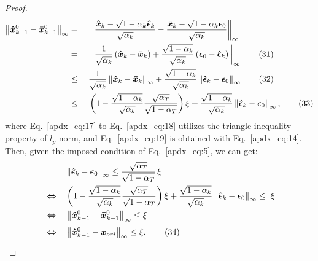 \documentclass{article}
\newtheorem{proof}{Proof}
\begin{document}
\begin{proof}
\begin{alignat}{2}
\left\|\boldsymbol{\Hat{x}}_{k-1}^{0} -  \boldsymbol{\Bar{x}}_{k-1}^{0}\right\|_\infty  \notag &  = && \left\|\frac{\boldsymbol{\Hat{x}}_{k} - \sqrt{1-\alpha_{k}}\boldsymbol{\Hat{\epsilon}}_{k}}{\sqrt{\alpha_{k}}} - \frac{\boldsymbol{\Bar{x}}_{k} - \sqrt{1-\alpha_{k}}\boldsymbol{\epsilon}_0}{\sqrt{\alpha_{k}}}\right\|_\infty \notag  \\
&= \;  && \left\| \frac{1}{\sqrt{\alpha_{k}}} \left(\boldsymbol{\Hat{x}}_{k} - \boldsymbol{\Bar{x}}_{k}\right) + \frac{\sqrt{1-\alpha_{k}}}{\sqrt{\alpha_{k}}} \left(\boldsymbol{{\epsilon}}_{0} - \boldsymbol{\Hat{\epsilon}}_{k}\right) \right\|_\infty \tag{31} \label{apdx_eq:17} \\ 
&\leq \;  && \frac{1}{\sqrt{\alpha_{k}}} \left \| \boldsymbol{\Hat{x}}_{k} - \boldsymbol{\Bar{x}}_{k} \right\|_\infty \notag  + \frac{\sqrt{1-\alpha_{k}}}{\sqrt{\alpha_{k}}} \left\| \boldsymbol{\Hat{\epsilon}}_{k} - \boldsymbol{{\epsilon}}_{0} \right\|_\infty \tag{32} \label{apdx_eq:18} \\
&\leq \;  && \left(1 - \frac{\sqrt{1-\alpha_{k}}}{\sqrt{\alpha_{k}}}\frac{\sqrt{\alpha_{T}}}{\sqrt{1-\alpha_{T}}}\right)\xi \notag  + \frac{\sqrt{1-\alpha_{k}}}{\sqrt{\alpha_{k}}} \left\| \boldsymbol{\Hat{\epsilon}}_{k} - \boldsymbol{{\epsilon}}_{0} \right\|_\infty, \tag{33} \label{apdx_eq:19}
\end{alignat}
where Eq.~\eqref{apdx_eq:17} to Eq.~\eqref{apdx_eq:18} utilizes the triangle inequality property of $l_p$-norm, and Eq.~\eqref{apdx_eq:19} is obtained with Eq.~\eqref{apdx_eq:14}. Then, given the imposed condition of Eq.~\eqref{apdx_eq:5}, we can get:
\begin{alignat}{2}
& && \left\| \boldsymbol{\Hat{\epsilon}}_{k} - \boldsymbol{{\epsilon}}_{0} \right\|_\infty \leq \frac{\sqrt{\alpha_{T}}}{\sqrt{1-\alpha_{T}}} \, \xi \notag \\
&\xLeftrightarrow{} && \left(1 - \frac{\sqrt{1-\alpha_{k}}}{\sqrt{\alpha_{k}}}\frac{\sqrt{\alpha_{T}}}{\sqrt{1-\alpha_{T}}}\right)\xi \notag  + \frac{\sqrt{1-\alpha_{k}}}{\sqrt{\alpha_{k}}} \left\| \boldsymbol{\Hat{\epsilon}}_{k} - \boldsymbol{{\epsilon}}_{0} \right\|_\infty \leq \;  \xi \notag \\
&\xLeftrightarrow{} && \left\|\boldsymbol{\Hat{x}}_{k-1}^{0} -  \boldsymbol{\Bar{x}}_{k-1}^{0}\right\|_\infty \leq \xi \notag \\
&\xLeftrightarrow{} && \left\|\boldsymbol{\Hat{x}}_{k-1}^{0} -  \boldsymbol{{x}}_{ori}\right\|_\infty \leq \xi \notag, \tag{34} \label{apdx_eq:20}

\end{alignat}
\end{proof}
\end{document}
